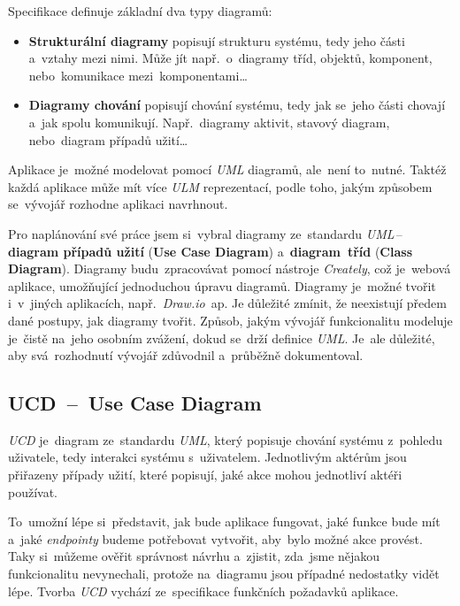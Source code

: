 \documentclass[11pt,a4paper]{report}
\begin{document}
            Specifikace definuje základní dva typy diagramů:
            \begin{itemize}
                \item \textbf{Strukturální diagramy} popisují strukturu systému, tedy jeho části a~vztahy mezi nimi. Může jít např.~o~diagramy tříd, objektů, komponent, nebo~komunikace mezi~komponentami\dots
                \item \textbf{Diagramy chování} popisují chování systému, tedy jak se~jeho části chovají a~jak spolu komunikují. Např.~diagramy aktivit, stavový diagram, nebo~diagram případů užití\dots
            \end{itemize}

            Aplikace je~možné modelovat pomocí \emph{UML} diagramů, ale~není to~nutné. Taktéž každá aplikace může mít více \emph{ULM} reprezentací, podle toho, jakým způsobem se~vývojář rozhodne aplikaci navrhnout. \cite{uml:diagram}

            Pro naplánování své práce jsem si~vybral diagramy ze~standardu \emph{UML}\,--\,\textbf{diagram případů užití} (\textbf{Use Case Diagram}) a~\textbf{diagram~tříd} (\textbf{Class Diagram}). Diagramy budu~zpracovávat pomocí nástroje \emph{Creately}, což je~webová aplikace, umožňující jednoduchou úpravu diagramů. Diagramy je~možné tvořit i~v~jiných aplikacích, např.~\emph{Draw.io}~ap. Je důležité zmínit, že neexistují předem dané postupy, jak diagramy tvořit. Způsob, jakým vývojář funkcionalitu modeluje je~čistě na~jeho osobním zvážení, dokud se~drží definice \emph{UML}. Je~ale důležité, aby svá~rozhodnutí vývojář zdůvodnil a~průběžně dokumentoval. \cite{uml:diagram}

            \subsection{UCD~--~Use Case Diagram}
                \emph{UCD} je~diagram ze~standardu \emph{UML}, který popisuje chování systému z~pohledu uživatele, tedy interakci systému s~uživatelem. Jednotlivým aktérům jsou přiřazeny případy užití, které popisují, jaké akce mohou jednotliví aktéři používat.

                To~umožní lépe si~představit, jak bude aplikace fungovat, jaké funkce bude mít a~jaké \emph{endpointy} budeme potřebovat vytvořit, aby~bylo možné akce provést. Taky si~můžeme ověřit správnost návrhu a~zjistit, zda~jsme nějakou funkcionalitu nevynechali, protože na~diagramu jsou případné nedostatky vidět lépe. Tvorba \emph{UCD} vychází ze~specifikace funkčních požadavků aplikace. \cite{uml:usecase}
\end{document}
